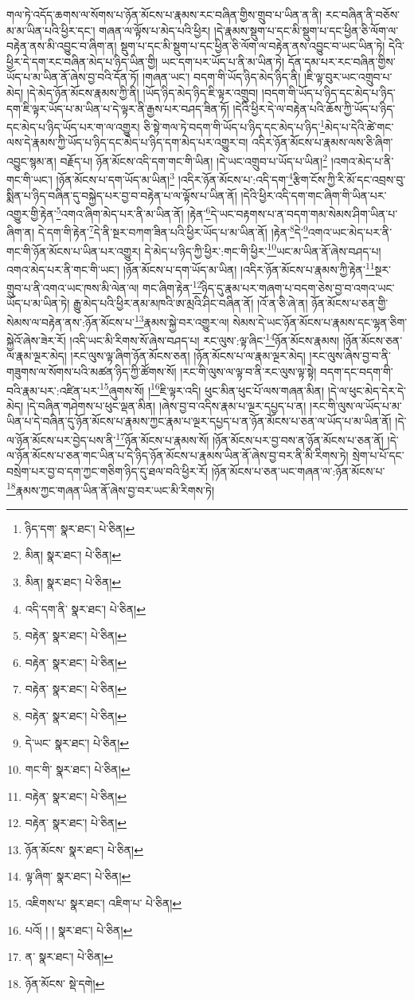 གལ་ཏེ་འདོད་ཆགས་ལ་སོགས་པ་ཉོན་མོངས་པ་རྣམས་རང་བཞིན་གྱིས་གྲུབ་པ་ཡིན་ན་ནི། རང་བཞིན་ནི་བཅོས་མ་མ་ཡིན་པའི་ཕྱིར་དང་། གཞན་ལ་ལྟོས་པ་མེད་པའི་ཕྱིར། །དེ་རྣམས་སྡུག་པ་དང་མི་སྡུག་པ་དང་ཕྱིན་ཅི་ལོག་ལ་བརྟེན་ནས་མི་འབྱུང་བ་ཞིག་ན། སྡུག་པ་དང་མི་སྡུག་པ་དང་ཕྱིན་ཅི་ལོག་ལ་བརྟེན་ནས་འབྱུང་བ་ཡང་ཡིན་ཏེ། དེའི་ཕྱིར་དེ་དག་རང་བཞིན་མེད་པ་ཉིད་ཡིན་གྱི། ཡང་དག་པར་ཡོད་པ་ནི་མ་ཡིན་ཏེ། དོན་དམ་པར་རང་བཞིན་གྱིས་ཡོད་པ་མ་ཡིན་ནོ་ཞེས་བྱ་བའི་དོན་ཏོ། །གཞན་ཡང་། བདག་གི་ཡོད་ཉིད་མེད་ཉིད་ནི། །ཇི་ལྟ་བུར་ཡང་འགྲུབ་པ་མེད། །དེ་མེད་ཉོན་མོངས་རྣམས་ཀྱི་ནི། །ཡོད་ཉིད་མེད་ཉིད་ཇི་ལྟར་འགྲུབ། །བདག་གི་ཡོད་པ་ཉིད་དང་མེད་པ་ཉིད་དག་ཇི་ལྟར་ཡོད་པ་མ་ཡིན་པ་དེ་ལྟར་ནི་རྒྱས་པར་བཤད་ཟིན་ཏོ། །དེའི་ཕྱིར་དེ་ལ་བརྟེན་པའི་ཆོས་ཀྱི་ཡོད་པ་ཉིད་དང་མེད་པ་ཉིད་ཡོད་པར་ག་ལ་འགྱུར། ཅི་སྟེ་གལ་ཏེ་བདག་གི་ཡོད་པ་ཉིད་དང་མེད་པ་ཉིད་\footnote{ཉིད་དག་  སྣར་ཐང་།  པེ་ཅིན། }མེད་པ་དེའི་ཚེ་གང་ལས་དེ་རྣམས་ཀྱི་ཡོད་པ་ཉིད་དང་མེད་པ་ཉིད་དག་མེད་པར་འགྱུར་བ། འདིར་ཉོན་མོངས་པ་རྣམས་ལས་ཅི་ཞིག་འབྱུང་སྙམ་ན། བརྗོད་པ། ཉོན་མོངས་འདི་དག་གང་གི་ཡིན། །དེ་ཡང་འགྲུབ་པ་ཡོད་པ་ཡིན།\footnote{མིན།  སྣར་ཐང་།  པེ་ཅིན། } །འགའ་མེད་པ་ནི་གང་གི་ཡང་། །ཉོན་མོངས་པ་དག་ཡོད་མ་ཡིན།\footnote{མིན།  སྣར་ཐང་།  པེ་ཅིན། } །འདིར་ཉོན་མོངས་པ་:འདི་དག་\footnote{འདི་དག་ནི་  སྣར་ཐང་།  པེ་ཅིན། }རྩིག་ངོས་ཀྱི་རི་མོ་དང་འབྲས་བུ་སྨིན་པ་ཉིད་བཞིན་དུ་བསྐྱེད་པར་བྱ་བ་བརྟེན་པ་ལ་ལྟོས་པ་ཡིན་ནོ། །དེའི་ཕྱིར་འདི་དག་གང་ཞིག་གི་ཡིན་པར་འགྱུར་གྱི་རྟེན་\footnote{བརྟེན་  སྣར་ཐང་།  པེ་ཅིན། }འགའ་ཞིག་མེད་པར་ནི་མ་ཡིན་ནོ། །རྟེན་\footnote{བརྟེན་  སྣར་ཐང་།  པེ་ཅིན། }དེ་ཡང་བརྟགས་པ་ན་བདག་གམ་སེམས་ཤིག་ཡིན་པ་ཞིག་ན། དེ་དག་གི་རྟེན་\footnote{བརྟེན་  སྣར་ཐང་།  པེ་ཅིན། }དེ་ནི་སྔར་བཀག་ཟིན་པའི་ཕྱིར་ཡོད་པ་མ་ཡིན་ནོ། །རྟེན་\footnote{བརྟེན་  སྣར་ཐང་།  པེ་ཅིན། }དེ་\footnote{དེ་ཡང་  སྣར་ཐང་།  པེ་ཅིན། }འགའ་ཡང་མེད་པར་ནི་གང་གི་ཉོན་མོངས་པ་ཡིན་པར་འགྱུར། དེ་མེད་པ་ཉིད་ཀྱི་ཕྱིར་:གང་གི་ཕྱིར་\footnote{གང་གི་  སྣར་ཐང་།  པེ་ཅིན། }ཡང་མ་ཡིན་ནོ་ཞེས་བཤད་པ། འགའ་མེད་པར་ནི་གང་གི་ཡང་། །ཉོན་མོངས་པ་དག་ཡོད་མ་ཡིན། །འདིར་ཉོན་མོངས་པ་རྣམས་ཀྱི་རྟེན་\footnote{བརྟེན་  སྣར་ཐང་།  པེ་ཅིན། }སྔར་གྲུབ་པ་ནི་འགའ་ཡང་ཁས་མི་ལེན་ལ། གང་ཞིག་རྟེན་\footnote{བརྟེན་  སྣར་ཐང་།  པེ་ཅིན། }ཉིད་དུ་རྣམ་པར་གཞག་པ་བདག་ཅེས་བྱ་བ་འགའ་ཡང་ཡོད་པ་མ་ཡིན་ཏེ། རྒྱུ་མེད་པའི་ཕྱིར་ནམ་མཁའི་ཨ་མྲའི་ཤིང་བཞིན་ནོ། །འོ་ན་ཅི་ཞེ་ན། ཉོན་མོངས་པ་ཅན་གྱི་སེམས་ལ་བརྟེན་ནས་:ཉོན་མོངས་པ་\footnote{ཉོན་མོངས་  སྣར་ཐང་།  པེ་ཅིན། }རྣམས་སྐྱེ་བར་འགྱུར་ལ། སེམས་དེ་ཡང་ཉོན་མོངས་པ་རྣམས་དང་ལྷན་ཅིག་སྐྱེའོ་ཞེས་ཟེར་རོ། །འདི་ཡང་མི་རིགས་སོ་ཞེས་བཤད་པ། རང་ལུས་:ལྟ་ཞིང་\footnote{ལྟ་ཞིག་  སྣར་ཐང་།  པེ་ཅིན། }ཉོན་མོངས་རྣམས། །ཉོན་མོངས་ཅན་ལ་རྣམ་ལྔར་མེད། །རང་ལུས་ལྟ་ཞིག་ཉོན་མོངས་ཅན། །ཉོན་མོངས་པ་ལ་རྣམ་ལྔར་མེད། །རང་ལུས་ཞེས་བྱ་བ་ནི་གཟུགས་ལ་སོགས་པའི་མཚན་ཉིད་ཀྱི་ཚོགས་སོ། །རང་གི་ལུས་ལ་ལྟ་བ་ནི་རང་ལུས་ལྟ་སྟེ། བདག་དང་བདག་གི་བའི་རྣམ་པར་:འཛིན་པར་\footnote{འཇིགས་པ་  སྣར་ཐང་། འཇིག་པ་  པེ་ཅིན། }ཞུགས་སོ། །\footnote{པའོ། ། །  སྣར་ཐང་།  པེ་ཅིན། }ཇི་ལྟར་འདི། ཕུང་མིན་ཕུང་པོ་ལས་གཞན་མིན། །དེ་ལ་ཕུང་མེད་དེར་དེ་མེད། །དེ་བཞིན་གཤེགས་པ་ཕུང་ལྡན་མིན། །ཞེས་བྱ་བ་འདིས་རྣམ་པ་ལྔར་དཔྱད་པ་ན། །རང་གི་ལུས་ལ་ཡོད་པ་མ་ཡིན་པ་དེ་བཞིན་དུ་ཉོན་མོངས་པ་རྣམས་ཀྱང་རྣམ་པ་ལྔར་དཔྱད་པ་ན་ཉོན་མོངས་པ་ཅན་ལ་ཡོད་པ་མ་ཡིན་ནོ། །དེ་ལ་ཉོན་མོངས་པར་བྱེད་པས་ནི་\footnote{ན་  སྣར་ཐང་།  པེ་ཅིན། }ཉོན་མོངས་པ་རྣམས་སོ། །ཉོན་མོངས་པར་བྱ་བས་ན་ཉོན་མོངས་པ་ཅན་ནོ། །དེ་ལ་ཉོན་མོངས་པ་ཅན་གང་ཡིན་པ་དེ་ཉིད་ཉོན་མོངས་པ་རྣམས་ཡིན་ནོ་ཞེས་བྱ་བར་ནི་མི་རིགས་ཏེ། སྲེག་པ་པོ་དང་བསྲེག་པར་བྱ་བ་དག་ཀྱང་གཅིག་ཉིད་དུ་ཐལ་བའི་ཕྱིར་རོ། །ཉོན་མོངས་པ་ཅན་ཡང་གཞན་ལ་:ཉོན་མོངས་པ་\footnote{ཉོན་མོངས་  སྡེ་དགེ། }རྣམས་ཀྱང་གཞན་ཡིན་ནོ་ཞེས་བྱ་བར་ཡང་མི་རིགས་ཏེ། 